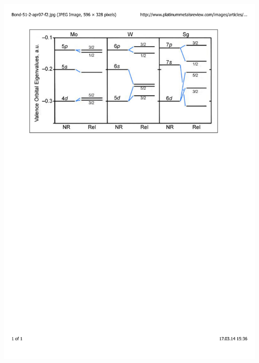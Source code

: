 \documentclass[mathserif,8pt]{beamer}
\begin{document}
\begin{frame}
\begin{columns}
\begin{column}{0.55\textwidth}
	\includegraphics[viewport = 0 520 520 800, clip, scale=0.35]{figures/orbital_energies.pdf}
    \end{column}
    \end{columns}
\end{frame}
\end{document}
